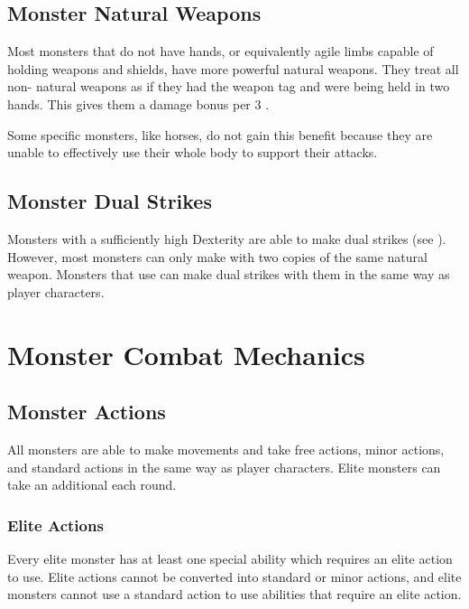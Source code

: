   \subsection{Monster Natural Weapons}\label{Monster Natural Weapon}
    Most monsters that do not have hands, or equivalently agile limbs capable of holding weapons and shields, have more powerful natural weapons.
    They treat all non- natural weapons as if they had the  weapon tag and were being held in two hands.
    This gives them a  damage bonus per 3 .

    Some specific monsters, like horses, do not gain this benefit because they are unable to effectively use their whole body to support their attacks.

  \subsection{Monster Dual Strikes}\label{Monster Dual Strikes}
    Monsters with a sufficiently high Dexterity are able to make dual strikes (see ).
    However, most monsters can only make  with two copies of the same  natural weapon.
    Monsters that use  can make dual strikes with them in the same way as player characters.

\section{Monster Combat Mechanics}

  \subsection{Monster Actions}\label{Monster Actions}
    All monsters are able to make movements and take free actions, minor actions, and standard actions in the same way as player characters.
    Elite monsters can take an additional  each round.

    \subsubsection{Elite Actions}\label{Elite Actions}
      Every elite monster has at least one special ability which requires an elite action to use.
      Elite actions cannot be converted into standard or minor actions, and elite monsters cannot use a standard action to use abilities that require an elite action.

